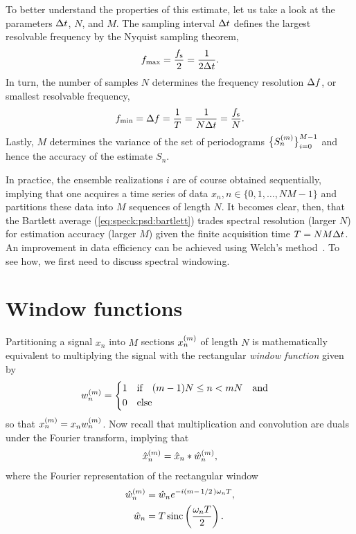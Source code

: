 To better understand the properties of this estimate, let us take a look at the parameters $\Delta t$, $N$, and $M$.
The sampling interval $\Delta t$ defines the largest resolvable frequency by the Nyquist sampling theorem,
\begin{align}\label{eq:speck:f_max}
    f_{\mathrm{max}} = \frac{f_{\mathrm{s}}}{2} = \frac{1}{2\Delta t}.
\end{align}
In turn, the number of samples $N$ determines the frequency resolution $\Delta f$, or smallest resolvable frequency,
\begin{align}\label{eq:speck:f_min}
    f_{\mathrm{min}} = \Delta f = \frac{1}{T} = \frac{1}{N\Delta t} = \frac{f_{\mathrm{s}}}{N}.
\end{align}
Lastly, $M$ determines the variance of the set of periodograms $\bigl\lbrace S_n^{(m)}\bigr\rbrace_{i=0}^{M-1}$ and hence the accuracy of the estimate $S_n$.

In practice, the ensemble realizations $i$ are of course obtained sequentially, implying that one acquires a time series of data $x_n, n\in\lbrace0, 1, \dotsc, NM - 1\rbrace$ and partitions these data into $M$ sequences of length $N$.
It becomes clear, then, that the Bartlett average (\cref{eq:speck:psd:bartlett}) trades spectral resolution (larger $N$) for estimation accuracy (larger $M$) given the finite acquisition time $T = NM\Delta t$.
An improvement in data efficiency can be achieved using Welch's method~\cite{Welch1967}.
To see how, we first need to discuss spectral windowing.

\section{Window functions}\label{sec:speck:theory:windows}
Partitioning a signal $x_n$ into $M$ sections $x_n^{(m)}$ of length $N$ is mathematically equivalent to multiplying the signal with the rectangular \emph{window function} given by
\begin{align}\label{eq:speck:window:boxcar}
    w_n\gth{m} =
    \begin{dcases}
        1 &\qif* (m - 1) N \leq n < m N\qand \\
        0 &\qelse*
    \end{dcases}
\end{align}
so that $x_n^{(m)} = x_n w_n^{(m)}$.
Now recall that multiplication and convolution are duals under the Fourier transform, implying that
\begin{align}\label{eq:speck:window:ft_pairs}
    \hat{x}_n^{(m)} = \hat{x}_n \ast \hat{w}_n^{(m)},
\end{align}
where the Fourier representation of the rectangular window
\begin{align}
    \hat{w}_n\gth{m} &= \hat{w}_n \e^{-\i(m - \flatfrac{1}{2})\omega_n T}, \label{eq:speck:window:boxcar:fourier}\\
             \hat{w}_n &= T\sinc\left(\frac{\omega_n T}{2}\right). \label{eq:speck:window:boxcar:fourier:unshifted}
\end{align}

